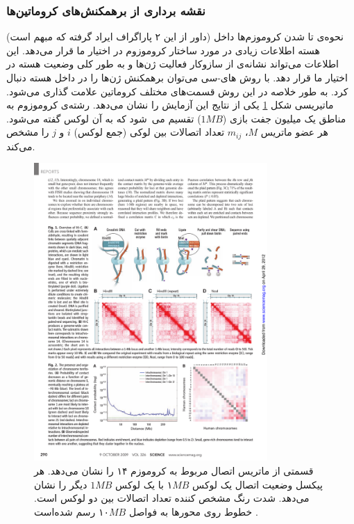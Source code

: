 \subsubsection{نقشه برداری از برهمکنش‌های کروماتین‌ها}
(داور از این ۲ پاراگراف ایراد گرفته که مبهم است) نحوه‌ی تا شدن کروموزم‌ها داخل هسته اطلاعات زیادی در مورد ساختار کروموزوم در اختیار ما قرار می‌دهد. این اطلاعات می‌تواند نشانه‌ی از سازوکار فعالیت ژن‌ها و به طور کلی وضعیت هسته در اختیار ما قرار دهد. با روش های-سی \cite{Lieberman-Aiden289} می‌توان برهمکنش ژن‌ها را در داخل هسته دنبال کرد. به طور خلاصه در این روش قسمت‌های مختلف کروماتین  علامت گذاری می‌شود.  ماتیریسی شکل \ref{fig:Hi-C} یکی از نتایج این آزمایش را نشان می‌دهد. رشته‌ی کروموزوم به مناطق یک میلیون جفت بازی ($1MB$)  تقسیم می شود که به آن لوکس گفته می‌شود. هر عضو ماتریس $M$، $m_{ij}$  تعداد اتصالات بین لوکی (جمع لوکس) $i$ و $j$ را مشخص می‌کند.
\begin{figure}[htbp]
\begin{center}
\includegraphics[width=3.5in]{Figs/Hi_C}
\caption{
  قسمتی از ماتریس اتصال مربوط به کروموزم ۱۴ را نشان می‌دهد. هر پیکسل وضعیت اتصال یک لوکس $۱MB$ با یک لوکس $1MB$ دیگر را نشان می‌دهد. شدت رنگ مشخص کننده تعداد اتصالات بین دو لوکس است. خطوط روی محورها به فواصل $۱۰MB$ رسم شده‌است \cite{Lieberman-Aiden289}.
}
\label{fig:Hi-C}
\end{center}
\end{figure}




